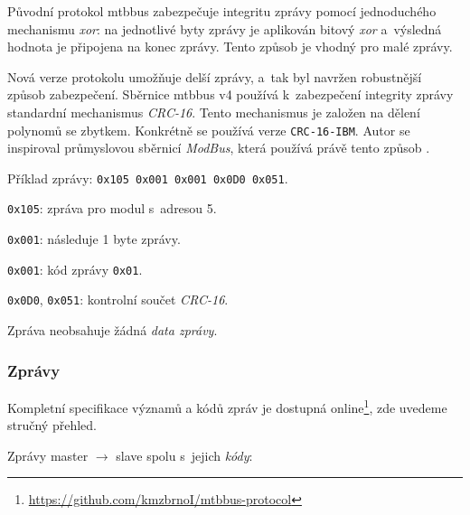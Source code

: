 \begin{enumerate}
Původní protokol \gls{mtbbus} zabezpečuje integritu zprávy pomocí jednoduchého
mechanismu \textit{xor}: na jednotlivé byty zprávy je aplikován bitový
\textit{xor} a~výsledná hodnota je připojena na konec zprávy. Tento způsob je
vhodný pro malé zprávy.

Nová verze protokolu umožňuje delší zprávy, a~tak byl navržen robustnější
způsob zabezpečení. Sběrnice \gls{mtbbus} v4 používá k~zabezpečení
integrity zprávy standardní mechanismus \textit{CRC-16}. Tento mechanismus je
založen na dělení polynomů se zbytkem. Konkrétně se používá verze
\texttt{CRC-16-IBM}. Autor se inspiroval průmyslovou sběrnicí
\textit{ModBus}, která používá právě tento způsob \cite{modbus-specs}.

\end{enumerate}

Příklad zprávy: \texttt{0x105 0x001 0x001 0x0D0 0x051}.

\begin{compactenum}
\item \texttt{0x105}: zpráva pro modul s~adresou 5.
\item \texttt{0x001}: následuje 1 byte zprávy.
\item \texttt{0x001}: kód zprávy \texttt{0x01}.
\item \texttt{0x0D0}, \texttt{0x051}: kontrolní součet \textit{CRC-16}.
\end{compactenum}

Zpráva neobsahuje žádná \textit{data zprávy}.

\subsubsection{\textbf{Zprávy}} \label{subsub:mtbbus-messages}

Kompletní specifikace významů a kódů zpráv je dostupná
online\footnote{\url{https://github.com/kmzbrnoI/mtbbus-protocol}}, zde uvedeme
struč\-ný přehled.

Zprávy master $\rightarrow$ slave spolu s~jejich \textit{kódy}:

